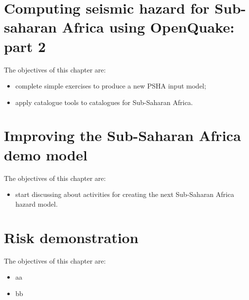\documentclass[11pt,a4paper,headings=small,dvips]{scrbook}
\newenvironment{myfancybox}{%
  \def\FrameCommand{\fboxsep=\FrameSep \fcolorbox{blue01}{honeydew}}%
  \color{black}\MakeFramed {\FrameRestore}}%
 {\endMakeFramed}
\begin{document}
\chapter{Computing seismic hazard for Sub-saharan Africa using OpenQuake: part 2}
\begin{myfancybox}
The objectives of this chapter are:
\begin{itemize}
    \item complete simple exercises to produce a new PSHA input model;
    \item apply catalogue tools to catalogues for Sub-Saharan Africa.
\end{itemize}
\end{myfancybox}
    
\cleardoublepage
\chapter{Improving the Sub-Saharan Africa demo model}
\begin{myfancybox}
The objectives of this chapter are:
\begin{itemize}
    \item start discussing about activities for creating the next Sub-Saharan 
        Africa hazard model.
\end{itemize}
\end{myfancybox}
    
\cleardoublepage
\chapter{Risk demonstration}
\begin{myfancybox}
The objectives of this chapter are:
\begin{itemize}
    \item aa
    \item bb
\end{itemize}
\end{myfancybox}
    
\cleardoublepage
\cleardoublepage


\cleardoublepage
\end{document}
